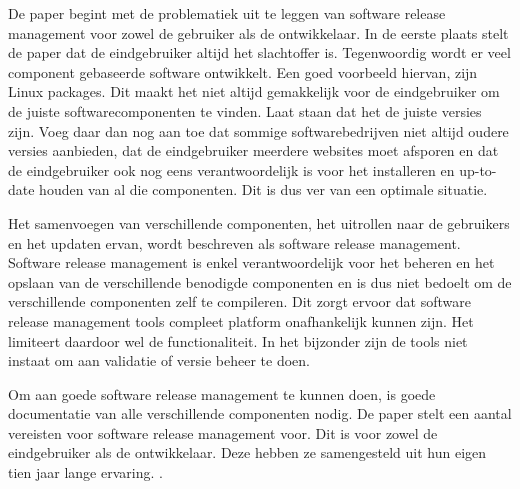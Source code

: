 De paper \autocite{Hoek2002} begint met de problematiek uit te leggen van software release management voor zowel de gebruiker als de ontwikkelaar. In de eerste plaats stelt de paper dat de eindgebruiker altijd het slachtoffer is. Tegenwoordig wordt er veel component gebaseerde software ontwikkelt. Een goed voorbeeld hiervan, zijn Linux packages. Dit maakt het niet altijd gemakkelijk voor de eindgebruiker om de juiste softwarecomponenten te vinden. Laat staan dat het de juiste versies zijn. Voeg daar dan nog aan toe dat sommige softwarebedrijven niet altijd oudere versies aanbieden, dat de eindgebruiker meerdere websites moet afsporen en dat de eindgebruiker ook nog eens verantwoordelijk is voor het installeren en up-to-date houden van al die componenten. Dit is dus ver van een optimale situatie.

Het samenvoegen van verschillende componenten, het uitrollen naar de gebruikers en het updaten ervan, wordt beschreven als software release management. Software release management is enkel verantwoordelijk voor het beheren en het opslaan van de verschillende benodigde componenten en is dus niet bedoelt om de verschillende componenten zelf te compileren. Dit zorgt ervoor dat software release management tools compleet platform onafhankelijk kunnen zijn. Het limiteert daardoor wel de functionaliteit. In het bijzonder zijn de tools niet instaat om aan validatie of versie beheer te doen.

Om aan goede software release management te kunnen doen, is goede documentatie van alle verschillende componenten nodig. De paper stelt een aantal vereisten voor software release management voor. Dit is voor zowel de eindgebruiker als de ontwikkelaar. Deze hebben ze samengesteld uit hun eigen tien jaar lange ervaring. \autocite{Hoek2002}.

